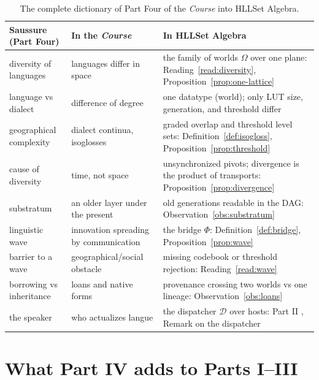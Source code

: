 \documentclass[11pt,a4paper]{article}
\theoremstyle{remark}
\newcommand{\Disp}{\ensuremath{\mathcal{D}}}             %
\newcommand{\Bridge}{\ensuremath{\Phi}}                  %
\newcommand{\Wset}{\ensuremath{\Omega}}                  %
\begin{document}
\begin{table}[htbp]
\centering
\renewcommand{\arraystretch}{1.2}
\begin{tabular}{@{}>{\raggedright\arraybackslash}p{3.6cm}
                    >{\raggedright\arraybackslash}p{4.2cm}
                    >{\raggedright\arraybackslash}p{6.8cm}@{}}
\toprule
Saussure (Part Four) & In the \textit{Course} & In HLLSet Algebra \\
\midrule
diversity of languages & languages differ in space & the family of worlds
$\Wset$ over one plane: Reading~\ref{read:diversity},
Proposition~\ref{prop:one-lattice} \\
language vs dialect & difference of degree & one datatype (world); only LUT
size, generation, and threshold differ \\
geographical complexity & dialect continua, isoglosses & graded overlap and
threshold level sets: Definition~\ref{def:isogloss},
Proposition~\ref{prop:threshold} \\
cause of diversity & time, not space & unsynchronized pivots; divergence is
the product of transports: Proposition~\ref{prop:divergence} \\
substratum & an older layer under the present & old generations readable in
the DAG: Observation~\ref{obs:substratum} \\
linguistic wave & innovation spreading by communication & the bridge
$\Bridge$: Definition~\ref{def:bridge}, Proposition~\ref{prop:wave} \\
barrier to a wave & geographical/social obstacle & missing codebook or
threshold rejection: Reading~\ref{read:wave} \\
borrowing vs inheritance & loans and native forms & provenance crossing two
worlds vs one lineage: Observation~\ref{obs:loans} \\
the speaker & who actualizes langue & the dispatcher $\Disp$ over hosts:
Part II \cite{part2}, Remark on the dispatcher \\
\bottomrule
\end{tabular}
\caption{The complete dictionary of Part Four of the \textit{Course} into
HLLSet Algebra.}
\label{tab:dictionary}
\end{table}

\FloatBarrier
\section{What Part IV adds to Parts I--III}
\label{sec:adds}
\end{document}

